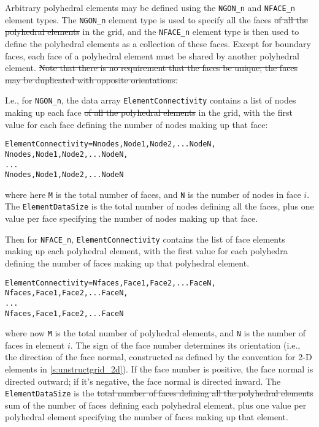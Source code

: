 \begin{changes}Arbitrary polyhedral elements may be defined using the \texttt{NGON\_n}
and \texttt{NFACE\_n} element types.
The \texttt{NGON\_n} element type is used to specify all the faces \sout{of all
the polyhedral elements} in the grid, and the \texttt{NFACE\_n} element type is then
used to define the polyhedral elements as a collection of these faces.
Except for boundary faces, each face of a polyhedral element must be
shared by another polyhedral element.
\sout{Note that there is no requirement that the faces be unique; the faces
may be duplicated with opposite orientations.}

I.e., for \texttt{NGON\_n}, the data array \texttt{ElementConnectivity}
contains a list of nodes making up each face \sout{of all the polyhedral
elements} in the grid, with the first value for each face defining the number of
nodes making up that face:
\begin{alltt}
  ElementConnectivity = Nnodes, Node1, Node2, ... NodeN,
                        Nnodes, Node1, Node2, ... NodeN,
                        ...
                        Nnodes, Node1, Node2, ... NodeN
\end{alltt}
where here \texttt{M} is the total number of faces, and
\texttt{N} is the number of nodes in face $i$.
The \texttt{ElementDataSize} is the total number of nodes defining all
the faces, plus one value per face specifying the number of nodes making
up that face.

Then for \texttt{NFACE\_n}, \texttt{ElementConnectivity} contains the
list of face elements making up each polyhedral element, with the first
value for each polyhedra defining the number of faces making up that
polyhedral element.
\begin{alltt}
  ElementConnectivity = Nfaces, Face1, Face2, ... FaceN,
                        Nfaces, Face1, Face2, ... FaceN,
                        ...
                        Nfaces, Face1, Face2, ... FaceN
\end{alltt}
where now \texttt{M} is the total number of polyhedral elements, and
\texttt{N} is the number of faces in element $i$.
The sign of the face number determines its orientation (i.e., the
direction of the face normal, constructed as defined by the
convention for 2-D elements in \autoref{s:unstructgrid_2d}).
If the face number is positive, the face normal is directed outward; if
it's negative, the face normal is directed inward.
The \texttt{ElementDataSize} is the \sout{total number of faces defining
all the polyhedral elements} sum of the number of faces defining each
polyhedral element, plus one value per polyhedral element
specifying the number of faces making up that element.\end{changes}

